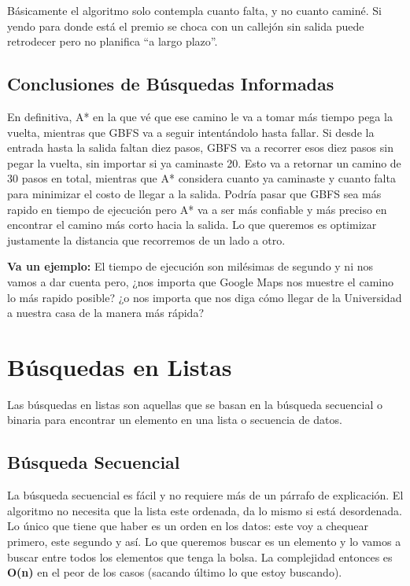\documentclass[12pt]{article}
\begin{document}
Básicamente el algoritmo solo contempla cuanto falta, y no cuanto caminé. Si yendo para donde está el premio se choca con un callejón sin salida puede retrodecer pero no planifica ``a largo plazo''.

\subsection{Conclusiones de Búsquedas Informadas}

En definitiva, A* en la que vé que ese camino le va a tomar más tiempo pega la vuelta, mientras que GBFS va a seguir intentándolo hasta fallar. Si desde la entrada hasta la salida faltan diez pasos, GBFS va a recorrer esos diez pasos sin pegar la vuelta, sin importar si ya caminaste 20. Esto va a retornar un camino de 30 pasos en total, mientras que A* considera cuanto ya caminaste y cuanto falta para minimizar el costo de llegar a la salida. Podría pasar que GBFS sea más rapido en tiempo de ejecución pero A* va a ser más confiable y más preciso en encontrar el camino más corto hacia la salida. Lo que queremos es optimizar justamente la distancia que recorremos de un lado a otro.

\vspace{0.5em}

\textbf{Va un ejemplo:} El tiempo de ejecución son milésimas de segundo y ni nos vamos a dar cuenta pero, ¿nos importa que Google Maps nos muestre el camino lo más rapido posible? ¿o nos importa que nos diga cómo llegar de la Universidad a nuestra casa de la manera más rápida?

\section{Búsquedas en Listas}

Las búsquedas en listas son aquellas que se basan en la búsqueda secuencial o binaria para encontrar un elemento en una lista o secuencia de datos.

\subsection{Búsqueda Secuencial}

La búsqueda secuencial es fácil y no requiere más de un párrafo de explicación. El algoritmo no necesita que la lista este ordenada, da lo mismo si está desordenada. Lo único que tiene que haber es un orden en los datos: este voy a chequear primero, este segundo y así. Lo que queremos buscar es un elemento y lo vamos a buscar entre todos los elementos que tenga la bolsa. La complejidad entonces es \textbf{O(n)} en el peor de los casos (sacando último lo que estoy buscando).
\end{document}
